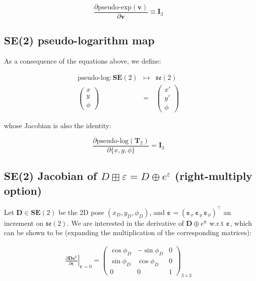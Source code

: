 \documentclass[a4paper,11pt]{report}
\newcommand{\E}{{\bm{\varepsilon}}}
\begin{document}
\begin{equation}
	\frac{\partial \text{pseudo-exp}(\mathbf{v})}{\partial \mathbf{v}}
\equiv 
\mathbf{I}_3
\end{equation}


\subsection{SE(2) pseudo-logarithm map}
\label{sect:se2.ps-log}

As a consequence of the equations above, we define:

\begin{eqnarray}
\label{eq:se2.pseudo-log}
  \text{pseudo-log}: \mathbf{SE}(2)&\mapsto& \mathfrak{se}(2) \\ 
  \left( \begin{array}{c} x \\ y \\ \phi \end{array} \right)
  &=&
  \left( \begin{array}{c} x' \\ y' \\ \phi \end{array} \right)
\end{eqnarray}

\noindent whose Jacobian is also the identity:

\begin{equation}
\frac{\partial \text{pseudo-log}(\mathbf{T}_2)}{\partial \{x,y, \phi\}} = 
\mathbf{I}_3
\end{equation}


\subsection{SE(2) Jacobian of $D\boxplus \varepsilon = D \oplus e^\varepsilon$  (right-multiply option)}
\label{sect:se2.jacob_De}

Let $\mathbf{D} \in \mathbf{SE}(2)$ be the 2D pose $(x_D,y_D,\phi_D)$, 
and $\E=(\E_x ~ \E_y ~ \E_{\phi})^\top$ an increment on $\mathfrak{se}(2)$. 
We are interested in the derivative of $\mathbf{D} \oplus e^\E$ w.r.t $\E$, 
which can be shown to be (expanding the multiplication of the corresponding matrices):

\begin{eqnarray}
\label{eq:se2.dDexpe_de}
\left. \frac{\partial \mathbf{D e^\E}}{\partial \E} \right|_{\E = 0}
=
\left(
\begin{array}{ccc}
\cos \phi_D & -\sin \phi_D & 0 \\
\sin \phi_D & \cos \phi_D & 0 \\
0 & 0 & 1
\end{array}
\right)_{3 \times 3}
\end{eqnarray}
\end{document}
